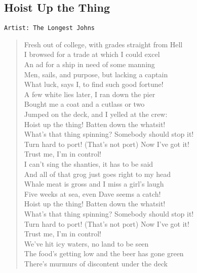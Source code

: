 \documentclass[11pt]{article}
\begin{document}
\subsection{Hoist Up the Thing}
\label{sec:org02d73d1}
\begin{verbatim}
Artist: The Longest Johns
\end{verbatim}
\begin{verse}
Fresh out of college, with grades straight from Hell\\
I browsed for a trade at which I could excel\\
An ad for a ship in need of some manning\\
Men, sails, and purpose, but lacking a captain\\
\vspace*{1em}
What luck, says I, to find such good fortune!\\
A few white lies later, I ran down the pier\\
Bought me a coat and a cutlass or two\\
Jumped on the deck, and I yelled at the crew:\\
\vspace*{1em}
Hoist up the thing! Batten down the whatsit!\\
What's that thing spinning? Somebody should stop it!\\
Turn hard to port! (That's not port) Now I've got it!\\
Trust me, I'm in control!\\
\vspace*{1em}
I can't sing the shanties, it has to be said\\
And all of that grog just goes right to my head\\
Whale meat is gross and I miss a girl's laugh\\
Five weeks at sea, even Dave seems a catch!\\
\vspace*{1em}
Hoist up the thing! Batten down the whatsit!\\
What's that thing spinning? Somebody should stop it!\\
Turn hard to port! (That's not port) Now I've got it!\\
Trust me, I'm in control!\\
\vspace*{1em}
We've hit icy waters, no land to be seen\\
The food's getting low and the beer has gone green\\
There's murmurs of discontent under the deck\\

\end{verse}
\end{document}
